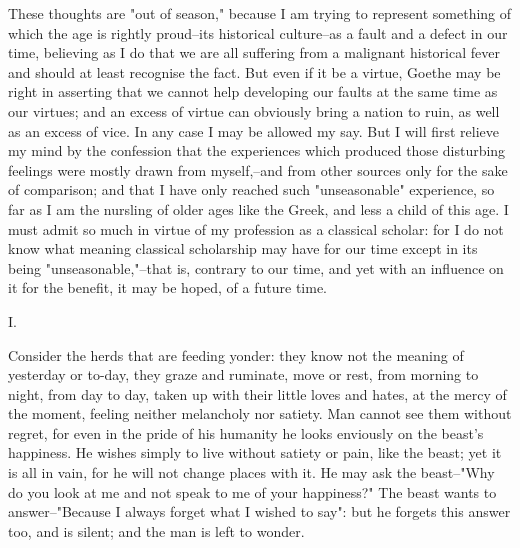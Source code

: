 These thoughts are "out of season," because I am trying to represent
something of which the age is rightly proud--its historical
culture--as a fault and a defect in our time, believing as I do that
we are all suffering from a malignant historical fever and should at
least recognise the fact. But even if it be a virtue, Goethe may be
right in asserting that we cannot help developing our faults at the
same time as our virtues; and an excess of virtue can obviously bring
a nation to ruin, as well as an excess of vice. In any case I may be
allowed my say. But I will first relieve my mind by the confession
that the experiences which produced those disturbing feelings were
mostly drawn from myself,--and from other sources only for the sake
of comparison; and that I have only reached such "unseasonable"
experience, so far as I am the nursling of older ages like the Greek,
and less a child of this age. I must admit so much in virtue of my
profession as a classical scholar: for I do not know what meaning
classical scholarship may have for our time except in its being
"unseasonable,"--that is, contrary to our time, and yet with an
influence on it for the benefit, it may be hoped, of a future time.


I.

Consider the herds that are feeding yonder: they know not the meaning
of yesterday or to-day, they graze and ruminate, move or rest, from
morning to night, from day to day, taken up with their little loves
and hates, at the mercy of the moment, feeling neither melancholy nor
satiety. Man cannot see them without regret, for even in the pride of
his humanity he looks enviously on the beast's happiness. He wishes
simply to live without satiety or pain, like the beast; yet it is all
in vain, for he will not change places with it. He may ask the
beast--"Why do you look at me and not speak to me of your happiness?"
The beast wants to answer--"Because I always forget what I wished to
say": but he forgets this answer too, and is silent; and the man is
left to wonder.

